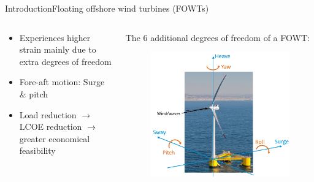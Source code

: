 \begin{frame}{Introduction}{Floating offshore wind turbines (FOWTs)}
	\begin{columns}
		\begin{column}{.49\textwidth}
			\begin{itemize}
				\item Experiences higher strain mainly due to extra degrees of freedom
				\item Fore-aft motion: Surge \& pitch
				\item Load reduction $ \rightarrow $ LCOE reduction $ \rightarrow $ greater economical feasibility
			\end{itemize}
		\end{column}
		
		\begin{column}{.49\textwidth}
			The 6 additional degrees of freedom of a FOWT:
			\begin{figure}[ht]
				\centering
				\includegraphics[width=1\linewidth]{../Graphics/FOWTcoordinates.png}
				\label{fig:fowt_coordinates}
			\end{figure}	
		\end{column}
	\end{columns}
\end{frame}


